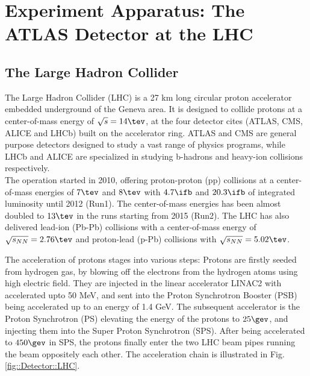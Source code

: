  \section{Experiment Apparatus:  The ATLAS Detector at the LHC}

\subsection{The Large Hadron Collider} 
The Large Hadron Collider (LHC) \cite{LHC} is a 27 km long circular proton accelerator embedded underground of the Geneva area.
It is designed to collide protons at a center-of-mass energy of $\sqrt{s} = 14 \tev$, at the four detector cites (ATLAS\cite{ATLAS_exp}, CMS\cite{CMS}, ALICE\cite{ALICE} and LHCb\cite{LHCb}) built on the accelerator ring. ATLAS and CMS are general purpose detectors designed to study a vast range of physics programs, while LHCb and ALICE are specialized in studying b-hadrons and heavy-ion collisions respectively. \\

The operation started in 2010, offering proton-proton (pp) collisions at a center-of-mass energies of $7\tev$ and $8\tev$ with $4.7\ifb$ and $20.3\ifb$ of integrated luminosity until 2012 (Run1). The center-of-mass energies has been almost doubled to $13\tev$
in the runs starting from 2015 (Run2). The LHC has also delivered lead-ion (Pb-Pb) collisions with a center-of-mass energy of $\sqrt{s_{NN}} = 2.76\tev$ and proton-lead (p-Pb) collisions with $\sqrt{s_{NN}} = 5.02\tev$.

% 


The acceleration of protons stages into various steps: 
Protons are firstly seeded from hydrogen gas, by blowing off the electrons from the hydrogen atoms using high electric field.
They are injected in the linear accelerator LINAC2 with accelerated upto 50 MeV, and sent into the Proton Synchrotron Booster (PSB) being accelerated up to an energy of 1.4 GeV. 
The subsequent accelerator is the Proton Synchrotron (PS) elevating the energy of the protons to $25\gev$, and injecting them into the Super Proton Synchrotron (SPS). After being accelerated to $450\gev$ in SPS, the protons finally enter the two LHC beam pipes running the beam oppositely each other. The acceleration chain is illustrated in Fig. \ref{fig::Detector::LHC}.

